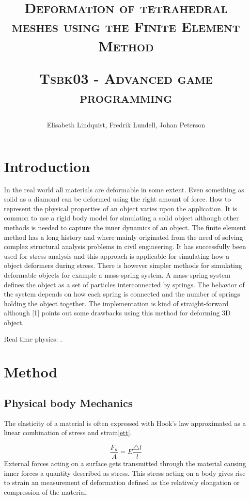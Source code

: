 \documentclass[10pt,a4paper]{article}
\author{Elisabeth Lindquist, Fredrik Lundell, Johan Peterson}
\title{\textsc{Deformation of tetrahedral meshes using the Finite Element Method}\\\begin{small}\textsc{Tsbk03 - Advanced game programming}\end{small}}
\begin{document}
\maketitle
\begin{abstract}

\end{abstract}
\pagebreak
\tableofcontents
\pagebreak

\section{Introduction}
In the real world all materials are deformable in some extent. Even something
as solid as a diamond can be deformed using the right amount of force. How to
represent the physical properties of an object varies upon the application. It is
common to use a rigid body model for simulating a solid object although other
methods is needed to capture the inner dynamics of an object.
The finite element method has a long history and where mainly originated
from the need of solving complex structural analysis problems in civil engineering.
It has successfully been used for stress analysis and this approach is
applicable for simulating how a object deformers during stress.
There is however simpler methods for simulating deformable objects for
example a mass-spring system. A mass-spring system defines the object as a
set of particles interconnected by springs. The behavior of the system depends
on how each spring is connected and the number of springs holding the object
together. The implementation is kind of straight-forward although [1] points
out some drawbacks using this method for deforming 3D object.

Real time physics: \cite{rt_phys}.
\section{Method}

\subsection{Physical body Mechanics}
The elasticity of a material is often expressed with Hook's law approximated as a linear combination of stress and strain\ref{ett}.

\begin{equation}\label{ett}
    \frac{F_{n}}{A} = E \frac{\triangle l}{l}
\end{equation}
External forces acting on a surface gets transmitted through the material causing inner forces a quantity described as stress. This stress acting on a body gives rise to strain an measurement of deformation defined as the relatively elongation or compression of the material.
\end{document}
